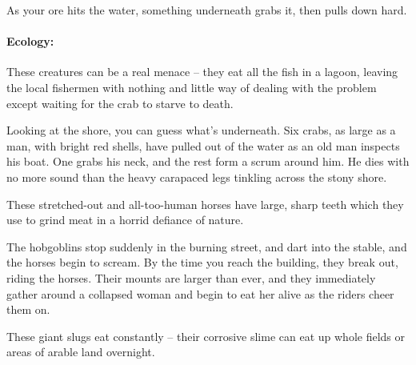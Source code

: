 \begin{multicols}{2}
\begin{boxtext}
  As your ore hits the water, something underneath grabs it, then pulls down hard.

\end{boxtext}

\paragraph{Ecology:} These creatures can be a real menace -- they eat all the fish in a lagoon, leaving the local fishermen with nothing and little way of dealing with the problem except waiting for the crab to starve to death.

\begin{boxtext}

  Looking at the shore, you can guess what's underneath.
  Six crabs, as large as a man, with bright red shells, have pulled out of the water as an old man inspects his boat.
  One grabs his neck, and the rest form a scrum around him.
  He dies with no more sound than the heavy carapaced legs tinkling across the stony shore.

\end{boxtext}



\label{nura_horse}

These stretched-out and all-too-human horses have large, sharp teeth which they use to grind meat in a horrid defiance of nature.

\begin{boxtext}

  The hobgoblins stop suddenly in the burning street, and dart into the stable, and the horses begin to scream.
  By the time you reach the building, they break out, riding the horses.
  Their mounts are larger than ever, and they immediately gather around a collapsed woman and begin to eat her alive as the riders cheer them on.

\end{boxtext}

\label{nura_slug}

These giant slugs eat constantly -- their corrosive slime can eat up whole fields or areas of arable land overnight.

\nurahorse


\label{nura_spider}


\end{multicols}
